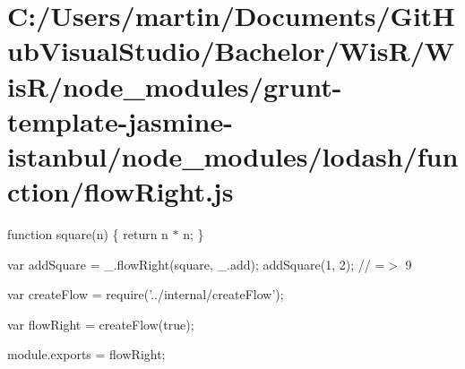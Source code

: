 \hypertarget{_c_1_2_users_2martin_2_documents_2_git_hub_visual_studio_2_bachelor_2_wis_r_2_wis_r_2node_module8560d6ff8553e2c820e980192466b58a}{}\section{C\+:/\+Users/martin/\+Documents/\+Git\+Hub\+Visual\+Studio/\+Bachelor/\+Wis\+R/\+Wis\+R/node\+\_\+modules/grunt-\/template-\/jasmine-\/istanbul/node\+\_\+modules/lodash/function/flow\+Right.\+js}
function square(n) \{ return n $\ast$ n; \}

var add\+Square = \+\_\+.\+flow\+Right(square, \+\_\+.\+add); add\+Square(1, 2); // =$>$ 9


\begin{DoxyCodeInclude}
var createFlow = require(\textcolor{stringliteral}{'../internal/createFlow'});

var flowRight = createFlow(\textcolor{keyword}{true});

module.exports = flowRight;
\end{DoxyCodeInclude}
 